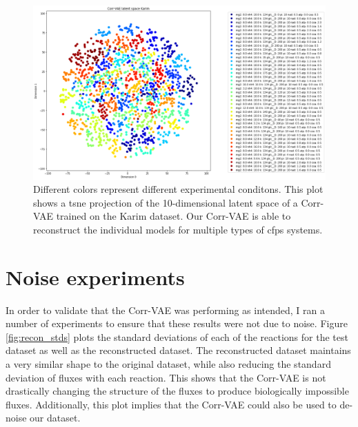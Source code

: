 \begin{figure}[t!]
\begin{center}
\includegraphics[width=1.01\textwidth]{figs/corrvae_karim_10d_latent.png}
\caption[Projection of the latent space of a 10-dimensional Corr-VAE trained on the Karim dataset]{Different colors represent different experimental conditons.
This plot shows a \gls{tsne} projection of the 10-dimensional latent space of a Corr-VAE trained on the Karim dataset.
Our Corr-VAE is able to reconstruct the individual models for multiple types of \gls{cfps} systems.
}
\label{fig:karim_10d}
\end{center}
\end{figure}

\section{Noise experiments}
In order to validate that the Corr-VAE was performing as intended, I ran a number of experiments to ensure that these results were not due to noise.
Figure \ref{fig:recon_stds} plots the standard deviations of each of the reactions for the test dataset as well as the reconstructed dataset.
The reconstructed dataset maintains a very similar shape to the original dataset, while also reducing the standard deviation of fluxes with each reaction.
This shows that the Corr-VAE is not drastically changing the structure of the fluxes to produce biologically impossible fluxes.
Additionally, this plot implies that the Corr-VAE could also be used to de-noise our dataset.

